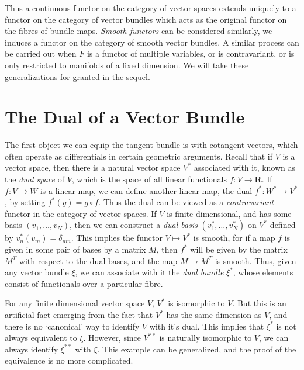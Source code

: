 Thus a continuous functor on the category of vector spaces extends uniquely to a functor on the category of vector bundles which acts as the original functor on the fibres of bundle maps. \emph{Smooth functors} can be considered similarly, we induces a functor on the category of smooth vector bundles. A similar process can be carried out when $F$ is a functor of multiple variables, or is contravariant, or is only restricted to manifolds of a fixed dimension. We will take these generalizations for granted in the sequel.

\section{The Dual of a Vector Bundle}

The first object we can equip the tangent bundle is with cotangent vectors, which often operate as differentials in certain geometric arguments. Recall that if $V$ is a vector space, then there is a natural vector space $V^*$ associated with it, known as the {\it dual space} of $V$, which is the space of all linear functionals $f: V \to \mathbf{R}$. If $f: V \to W$ is a linear map, we can define another linear map, the dual $f^*: W^* \to V^*$, by setting $f^*(g) = g \circ f$. Thus the dual can be viewed as a {\it contravariant} functor in the category of vector spaces. If $V$ is finite dimensional, and has some basis $(v_1, \dots, v_N)$, then we can construct a {\it dual basis} $(v_1^*, \dots, v_N^*)$ on $V^*$ defined by $v_n^*(v_m) = \delta_{nm}$. This implies the functor $V \mapsto V^*$ is smooth, for if a map $f$ is given in some pair of bases by a matrix $M$, then $f^*$ will be given by the matrix $M^T$ with respect to the dual bases, and the map $M \mapsto M^T$ is smooth. Thus, given any vector bundle $\xi$, we can associate with it the {\it dual bundle} $\xi^*$, whose elements consist of functionals over a particular fibre.

For any finite dimensional vector space $V$, $V^*$ is isomorphic to $V$. But this is an artificial fact emerging from the fact that $V^*$ has the same dimension as $V$, and there is no `canonical' way to identify $V$ with it's dual. This implies that $\xi^*$ is not always equivalent to $\xi$. However, since $V^{**}$ is naturally isomorphic to $V$, we can always identify $\xi^{**}$ with $\xi$. This example can be generalized, and the proof of the equivalence is no more complicated.


